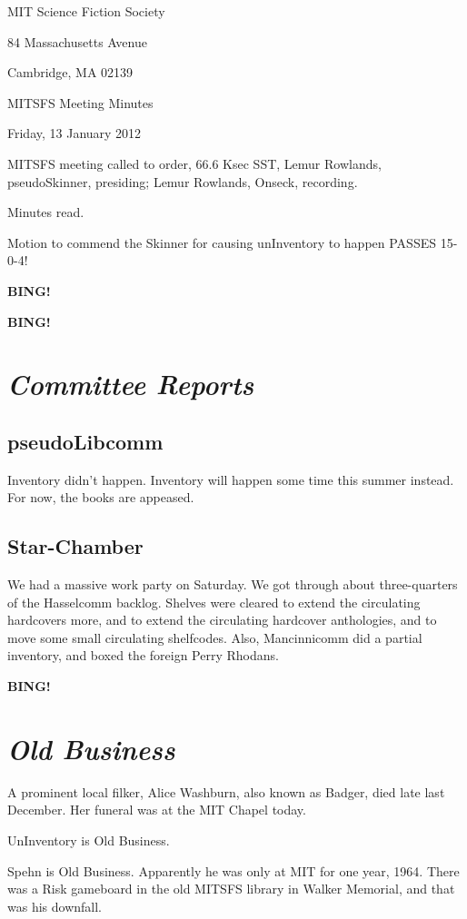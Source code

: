 \documentclass[10pt]{article}
\newcommand{\bing}{{\bf BING!} }
\newcommand{\goto}[1]{\bing \vskip 12pt \section*{{\em{#1}}}}
\newcommand{\skinner}{Lemur Rowlands, pseudoSkinner}
\newcommand{\onseck}{Lemur Rowlands, Onseck}
\newcommand{\meetingdate}{Friday, 13 January 2012}
\begin{document}
\begin{center}

MIT Science Fiction Society

84 Massachusetts Avenue

Cambridge, MA 02139

\vspace{12pt}

MITSFS Meeting Minutes

\meetingdate

\end{center}

\vspace{18pt}

\setlength{\parskip}{6pt}

\noindent
MITSFS meeting called to order, 66.6 Ksec SST,
\skinner, presiding; \onseck, recording.

Minutes read.

Motion to commend the Skinner for causing unInventory to happen
PASSES 15-0-4!

\bing

\goto{Committee Reports}

\subsection*{pseudoLibcomm}

Inventory didn't happen.  Inventory will happen some time this summer instead.
For now, the books are appeased.

\subsection*{Star-Chamber}

We had a massive work party on Saturday.  We got through about three-quarters
of the Hasselcomm backlog.  Shelves were cleared to extend the circulating
hardcovers more, and to extend the circulating hardcover anthologies, and to
move some small circulating shelfcodes.  Also, Mancinnicomm did a partial
inventory, and boxed the foreign Perry Rhodans.

\goto{Old Business}

A prominent local filker, Alice Washburn, also known as Badger, died late
last December.  Her funeral was at the MIT Chapel today.

UnInventory is Old Business.

Spehn is Old Business.  Apparently he was only at MIT for one year, 1964.  There
was a Risk gameboard in the old MITSFS library in Walker Memorial, and that was
his downfall.
\end{document}
